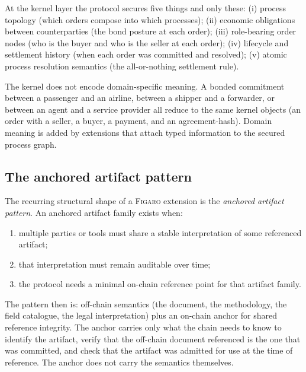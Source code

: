 \documentclass[11pt,a4paper]{article}
\theoremstyle{definition}
\theoremstyle{remark}
\newcommand{\figaro}{\textsc{Figaro}}
\begin{document}
At the kernel layer the protocol secures five things and only these:
(i) process topology (which orders compose into which processes);
(ii) economic obligations between counterparties (the bond posture
at each order); (iii) role-bearing order nodes (who is the buyer and
who is the seller at each order); (iv) lifecycle and settlement
history (when each order was committed and resolved); (v) atomic
process resolution semantics (the all-or-nothing settlement rule).

The kernel does not encode domain-specific meaning. A bonded
commitment between a passenger and an airline, between a shipper and
a forwarder, or between an agent and a service provider all reduce
to the same kernel objects (an order with a seller, a buyer, a
payment, and an agreement-hash). Domain meaning is added by
extensions that attach typed information to the secured process
graph.

\subsection{The anchored artifact pattern}

The recurring structural shape of a \figaro{} extension is the
\emph{anchored artifact pattern}. An anchored artifact family
exists when:

\begin{enumerate}[label=(\arabic*)]
  \item multiple parties or tools must share a stable interpretation
    of some referenced artifact;
  \item that interpretation must remain auditable over time;
  \item the protocol needs a minimal on-chain reference point for
    that artifact family.
\end{enumerate}

The pattern then is: off-chain semantics (the document, the
methodology, the field catalogue, the legal interpretation) plus an
on-chain anchor for shared reference integrity. The anchor carries
only what the chain needs to know to identify the artifact, verify
that the off-chain document referenced is the one that was committed,
and check that the artifact was admitted for use at the time of
reference. The anchor does not carry the semantics themselves.
\end{document}
